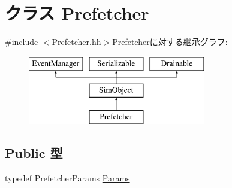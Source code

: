 \hypertarget{classPrefetcher}{
\section{クラス Prefetcher}
\label{classPrefetcher}
}


{\ttfamily \#include $<$Prefetcher.hh$>$}Prefetcherに対する継承グラフ:\begin{figure}[H]
\begin{center}
\leavevmode
\includegraphics[height=3cm]{classPrefetcher}
\end{center}
\end{figure}
\subsection*{Public 型}
\begin{DoxyCompactItemize}
\item 
typedef PrefetcherParams \hyperlink{classPrefetcher_aa178e3582d29b08c028c11634875499c}{Params}
\end{DoxyCompactItemize}
